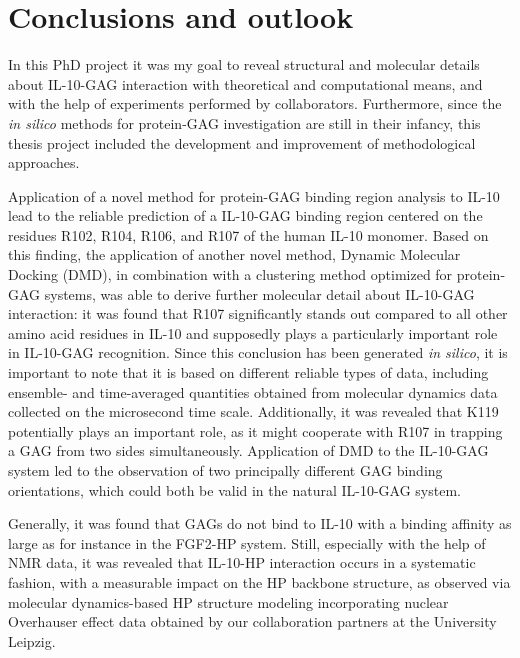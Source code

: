 \chapter{Conclusions and outlook}

In this PhD project it was my goal to reveal structural and molecular details
about IL-10-GAG interaction with theoretical and computational means, and with
the help of experiments performed by collaborators. Furthermore, since the
\textit{in silico} methods for protein-GAG investigation are still in their
infancy, this thesis project included the development and improvement of
methodological approaches.

Application of a novel method for protein-GAG binding region analysis to IL-10
lead to the reliable prediction of a IL-10-GAG binding region centered on the
residues R102, R104, R106, and R107 of the human IL-10 monomer. Based on this
finding, the application of another novel method, Dynamic Molecular Docking
(DMD), in combination with a clustering method optimized for protein-GAG
systems, was able to derive further molecular detail about IL-10-GAG
interaction: it was found that R107 significantly stands out compared to all
other amino acid residues in IL-10 and supposedly plays a particularly important
role in IL-10-GAG recognition. Since this conclusion has been generated
\textit{in silico}, it is important to note that it is based on different
reliable types of data, including ensemble- and time-averaged quantities
obtained from molecular dynamics data collected on the microsecond time scale.
Additionally, it was revealed that K119 potentially plays an important role, as
it might cooperate with R107 in trapping a GAG from two sides simultaneously.
Application of DMD to the IL-10-GAG system led to the observation of two
principally different GAG binding orientations, which could both be valid in the
natural IL-10-GAG system.

Generally, it was found that GAGs do not bind to IL-10 with a binding affinity
as large as for instance in the FGF2-HP system. Still, especially with the help
of NMR data, it was revealed that IL-10-HP interaction occurs in a systematic
fashion, with a measurable impact on the HP backbone structure, as observed via
molecular dynamics-based HP structure modeling incorporating nuclear Overhauser
effect data obtained by our collaboration partners at the University Leipzig.


